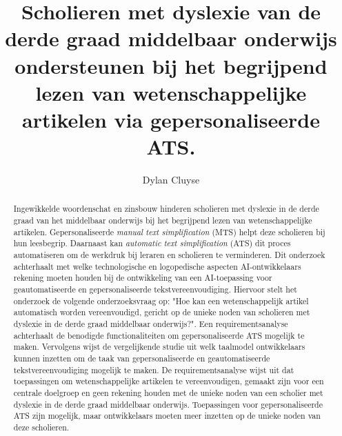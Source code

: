 \documentclass[a0,portrait]{hogent-poster}
\title{\Huge Scholieren met dyslexie van de derde graad middelbaar onderwijs ondersteunen bij het begrijpend lezen van wetenschappelijke artikelen via gepersonaliseerde ATS.}
\subtitle{}
\author{Dylan Cluyse}
\begin{document}
\maketitle

\begin{abstract}
Ingewikkelde woordenschat en zinsbouw hinderen scholieren met dyslexie in de derde graad van het middelbaar onderwijs bij het begrijpend lezen van wetenschappelijke artikelen. Gepersonaliseerde \textit{manual text simplification} (MTS) helpt deze scholieren bij hun leesbegrip. Daarnaast kan \textit{automatic text simplification} (ATS) dit proces automatiseren om de werkdruk bij leraren en scholieren te verminderen. Dit onderzoek achterhaalt met welke technologische en logopedische aspecten AI-ontwikkelaars rekening moeten houden bij de ontwikkeling van een AI-toepassing voor geautomatiseerde en gepersonaliseerde tekstvereenvoudiging. Hiervoor stelt het onderzoek de volgende onderzoeksvraag op: "Hoe kan een wetenschappelijk artikel automatisch worden vereenvoudigd, gericht op de unieke noden van scholieren met dyslexie in de derde graad middelbaar onderwijs?". Een requirementsanalyse achterhaalt de benodigde functionaliteiten om gepersonaliseerde ATS mogelijk te maken. Vervolgens wijst de vergelijkende studie uit welk taalmodel ontwikkelaars kunnen inzetten om de taak van gepersonaliseerde en geautomatiseerde tekstvereenvoudiging mogelijk te maken. De requirementsanalyse wijst uit dat toepassingen om wetenschappelijke artikelen te vereenvoudigen, gemaakt zijn voor een centrale doelgroep en geen rekening houden met de unieke noden van een scholier met dyslexie in de derde graad middelbaar onderwijs. Toepassingen voor gepersonaliseerde ATS zijn mogelijk, maar ontwikkelaars moeten meer inzetten op de unieke noden van deze scholieren.
\end{abstract}
\end{document}
